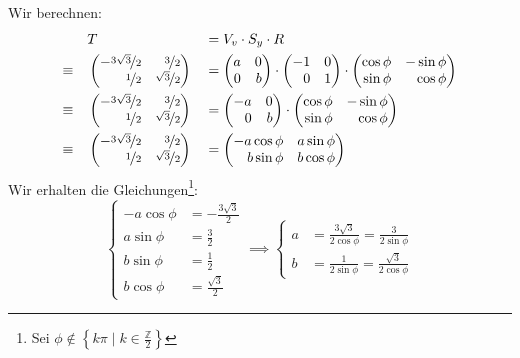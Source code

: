 \documentclass[answers]{exam}
\newcommand{\vektor}[1]{\begin{pmatrix*}[r] #1 \end{pmatrix*}}
\newcommand{\Z}{\mathbb{Z}}
\begin{document}
\begin{questions}
\begin{solution}
        Wir berechnen:
        $$
            \begin{aligned}
                             & T                                &                 & = V_v \cdot S_y \cdot R \\
                \equiv \quad & \vektor{-\nicefrac{3\sqrt{3}}{2} & \nicefrac{3}{2}                           \\ \nicefrac{1}{2} & \nicefrac{\sqrt{3}}{2} } && = \vektor{a & 0 \\ 0 & b} \cdot \vektor{-1 & 0 \\ 0 & 1} \cdot \vektor{\cos\phi & -\sin\phi \\ \sin\phi & \cos\phi} \\
                \equiv \quad & \vektor{-\nicefrac{3\sqrt{3}}{2} & \nicefrac{3}{2}                           \\ \nicefrac{1}{2} & \nicefrac{\sqrt{3}}{2} } && = \vektor{-a & 0 \\ 0 & b} \cdot \vektor{\cos\phi & -\sin\phi \\ \sin\phi & \cos\phi} \\
                \equiv \quad & \vektor{-\nicefrac{3\sqrt{3}}{2} & \nicefrac{3}{2}                           \\ \nicefrac{1}{2} & \nicefrac{\sqrt{3}}{2} } && = \vektor{-a \cos\phi & a\sin\phi \\ b\sin\phi & b\cos\phi}
            \end{aligned}
        $$
        Wir erhalten die Gleichungen\footnote{Sei $\phi \notin \left\{ k \pi \mid k \in \frac{\Z}{2}\right\}$}:
        $$
            \begin{cases}
                -a\cos\phi & = -\frac{3\sqrt{3}}{2} \\
                a\sin\phi  & = \frac{3}{2}          \\
                b\sin\phi  & = \frac{1}{2}          \\
                b\cos\phi  & = \frac{\sqrt{3}}{2}
            \end{cases}
            \implies
            \begin{cases}
                a & = \frac{3\sqrt{3}}{2\cos\phi} = \frac{3}{2\sin\phi} \\
                b & = \frac{1}{2\sin\phi} = \frac{\sqrt{3}}{2\cos\phi}
            \end{cases}
        $$


\end{solution}
\end{questions}
\end{document}
